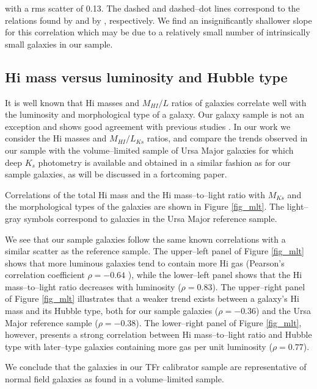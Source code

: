 \documentclass[usenatbib,useAMS]{mnras}
\begin{document}
with a rms scatter of 0.13.  The dashed and dashed--dot lines correspond
to the relations found by \citet{versanc01} and by \citet{martinsson11},
respectively.  We find an insignificantly shallower slope for this
correlation which may be due to a relatively small number of
intrinsically small galaxies in our sample. 


\subsection{H{\sc i} mass versus luminosity and Hubble type}

It is well known that H{\sc i} masses and $M_{HI}/L$ ratios of galaxies
correlate well with the luminosity and morphological type of a galaxy. 
Our galaxy sample is not an exception and shows good agreement with
previous studies \citep{roberts94, versanc01, swaters02}.  In our work
we consider the H{\sc i} masses and $M_{HI}/L_{Ks}$ ratios, and compare
the trends observed in our sample with the volume--limited sample of
Ursa Major galaxies \citep{versanc01} for which deep $K_{s}$ photometry
is available and obtained in a similar fashion as for our sample
galaxies, as will be discussed in a fortcoming paper. 

Correlations of the total H{\sc i} mass and the H{\sc i} mass--to--light
ratio with $M_{Ks}$ and the morphological types of the galaxies are
shown in Figure \ref{fig_mlt}.  The light--gray symbols correspond to
galaxies in the Ursa Major reference sample. 

We see that our sample galaxies follow the same known correlations
with a similar scatter as the reference sample.  The upper--left panel
of Figure \ref{fig_mlt} shows that more luminous galaxies tend to
contain more H{\sc i} gas (Pearson's correlation coefficient $\rho=
-0.64$ ), while the lower--left panel shows that the H{\sc i}
mass--to--light ratio decreases with luminosity ($\rho= 0.83$).  The
upper--right panel of Figure \ref{fig_mlt} illustrates that a weaker
trend exists between a galaxy's H{\sc i} mass and its Hubble type, both
for our sample galaxies ($\rho= -0.36$) and the Ursa Major reference
sample ($\rho= -0.38$).  The lower--right panel of Figure \ref{fig_mlt},
however, presents a strong correlation between H{\sc i} mass--to--light
ratio and Hubble type with later--type galaxies containing more gas per
unit luminosity ($\rho= 0.77$). 
  
We conclude that the galaxies in our TFr calibrator sample are
representative of normal field galaxies as found in a volume--limited
sample.
\end{document}
